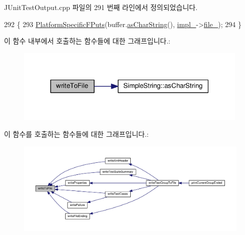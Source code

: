 J\+Unit\+Test\+Output.\+cpp 파일의 291 번째 라인에서 정의되었습니다.


\begin{DoxyCode}
292 \{
293     \hyperlink{_platform_specific_functions__c_8h_a73dcd414bf2d8d027cd256046b22fd2b}{PlatformSpecificFPuts}(buffer.\hyperlink{class_simple_string_af7c0efaf31f42553f05719903c830be1}{asCharString}(), 
      \hyperlink{class_j_unit_test_output_a123a6133cd44cdaa2c63a519f9fb56f4}{impl\_}->\hyperlink{struct_j_unit_test_output_impl_a93fd9238f523c59f16336fec983123ee}{file\_});
294 \}
\end{DoxyCode}


이 함수 내부에서 호출하는 함수들에 대한 그래프입니다.\+:
\nopagebreak
\begin{figure}[H]
\begin{center}
\leavevmode
\includegraphics[width=316pt]{class_j_unit_test_output_afddf11a4a5947cd26322aedec8a6dc9a_cgraph}
\end{center}
\end{figure}




이 함수를 호출하는 함수들에 대한 그래프입니다.\+:
\nopagebreak
\begin{figure}[H]
\begin{center}
\leavevmode
\includegraphics[width=350pt]{class_j_unit_test_output_afddf11a4a5947cd26322aedec8a6dc9a_icgraph}
\end{center}
\end{figure}


